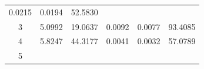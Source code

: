 \documentclass[11pt,]{article}
\begin{document}
\begin{longtable}[]{@{}cccccc@{}}
\begin{minipage}[t]{0.11\columnwidth}
0.0215\strut
\end{minipage} & \begin{minipage}[t]{0.14\columnwidth}\centering\strut
0.0194\strut
\end{minipage} & \begin{minipage}[t]{0.13\columnwidth}\centering\strut
52.5830\strut
\end{minipage}\tabularnewline
\begin{minipage}[t]{0.08\columnwidth}\centering\strut
3\strut
\end{minipage} & \begin{minipage}[t]{0.11\columnwidth}\centering\strut
5.0992\strut
\end{minipage} & \begin{minipage}[t]{0.26\columnwidth}\centering\strut
19.0637\strut
\end{minipage} & \begin{minipage}[t]{0.11\columnwidth}\centering\strut
0.0092\strut
\end{minipage} & \begin{minipage}[t]{0.14\columnwidth}\centering\strut
0.0077\strut
\end{minipage} & \begin{minipage}[t]{0.13\columnwidth}\centering\strut
93.4085\strut
\end{minipage}\tabularnewline
\begin{minipage}[t]{0.08\columnwidth}\centering\strut
4\strut
\end{minipage} & \begin{minipage}[t]{0.11\columnwidth}\centering\strut
5.8247\strut
\end{minipage} & \begin{minipage}[t]{0.26\columnwidth}\centering\strut
44.3177\strut
\end{minipage} & \begin{minipage}[t]{0.11\columnwidth}\centering\strut
0.0041\strut
\end{minipage} & \begin{minipage}[t]{0.14\columnwidth}\centering\strut
0.0032\strut
\end{minipage} & \begin{minipage}[t]{0.13\columnwidth}\centering\strut
57.0789\strut
\end{minipage}\tabularnewline
\begin{minipage}[t]{0.08\columnwidth}\centering\strut
5\strut
\end{minipage} & \begin{minipage}[t]{0.11\columnwidth}\centering\strut

\end{minipage}
\end{longtable}
\end{document}
